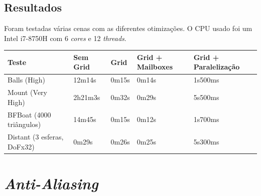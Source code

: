 \documentclass{article}
\begin{document}
        \subsection*{Resultados}
        Foram testadas várias cenas com as diferentes otimizações. O CPU usado foi um Intel i7-8750H com 6 \textit{cores} e 12 \textit{threads}.
        \begin{table}[h]
            \centering
            \begin{tabular}{|l|l|l|l|l|}
                \hline
                Teste                      & Sem Grid & Grid  & Grid + Mailboxes & Grid + Paralelização \\ \hline
                Balls (High)               & 12m14s   & 0m15s & 0m14s            & 1s500ms              \\ \hline
                Mount (Very High)          & 2h21m3s  & 0m32s & 0m29s            & 5s500ms              \\ \hline
                BFBoat (4000 triângulos)   & 14m45s   & 0m15s & 0m12s            & 1s700ms              \\ \hline
                Distant (3 esferas, DoFx32)& 0m29s    & 0m26s & 0m25s            & 5s300ms              \\ \hline
            \end{tabular}
        \end{table}


    \section*{\textit{Anti-Aliasing}}
\end{document}
